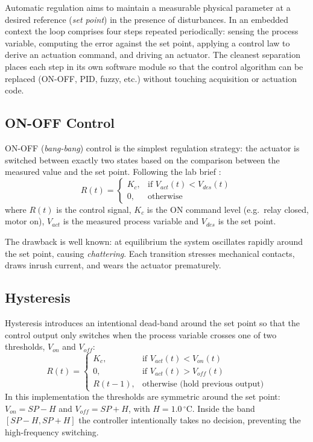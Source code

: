 \documentclass[12pt]{article}
\begin{document}
Automatic regulation aims to maintain a measurable physical parameter at a desired reference (\emph{set point}) in the presence of disturbances. In an embedded context the loop comprises four steps repeated periodically: sensing the process variable, computing the error against the set point, applying a control law to derive an actuation command, and driving an actuator. The cleanest separation places each step in its own software module so that the control algorithm can be replaced (ON-OFF, PID, fuzzy, etc.) without touching acquisition or actuation code.

\subsection{ON-OFF Control}

ON-OFF (\emph{bang-bang}) control is the simplest regulation strategy: the actuator is switched between exactly two states based on the comparison between the measured value and the set point. Following the lab brief \cite{labbrief}:
\begin{equation}
R(t) = \begin{cases}
K_c, & \text{if } V_{act}(t) < V_{des}(t) \\
0,   & \text{otherwise}
\end{cases}
\label{eq:onoff}
\end{equation}
where $R(t)$ is the control signal, $K_c$ is the ON command level (e.g.\ relay closed, motor on), $V_{act}$ is the measured process variable and $V_{des}$ is the set point.

The drawback is well known: at equilibrium the system oscillates rapidly around the set point, causing \emph{chattering}. Each transition stresses mechanical contacts, draws inrush current, and wears the actuator prematurely.

\subsection{Hysteresis}

Hysteresis introduces an intentional dead-band around the set point so that the control output only switches when the process variable crosses one of two thresholds, $V_{on}$ and $V_{off}$:
\begin{equation}
R(t) = \begin{cases}
K_c,     & \text{if } V_{act}(t) < V_{on}(t) \\
0,       & \text{if } V_{act}(t) > V_{off}(t) \\
R(t-1),  & \text{otherwise (hold previous output)}
\end{cases}
\label{eq:hysteresis}
\end{equation}
In this implementation the thresholds are symmetric around the set point: $V_{on} = SP - H$ and $V_{off} = SP + H$, with $H = 1.0\,^{\circ}$C. Inside the band $[SP-H, SP+H]$ the controller intentionally takes no decision, preventing the high-frequency switching.
\end{document}
